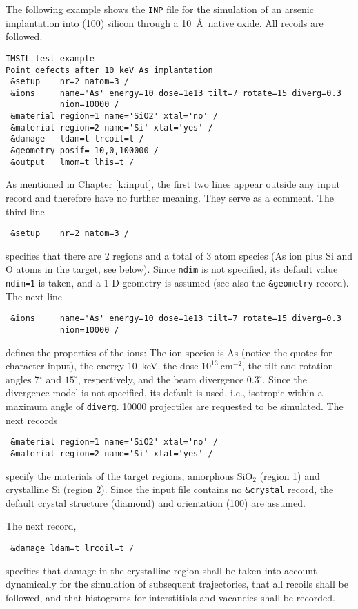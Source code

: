 The following example shows the \texttt{INP} file for the simulation of an 
arsenic implantation into (100) silicon through a 10~\AA\ native oxide. All
recoils are followed.

\begin{verbatim}
IMSIL test example
Point defects after 10 keV As implantation
 &setup    nr=2 natom=3 /
 &ions     name='As' energy=10 dose=1e13 tilt=7 rotate=15 diverg=0.3 
           nion=10000 /
 &material region=1 name='SiO2' xtal='no' /
 &material region=2 name='Si' xtal='yes' /
 &damage   ldam=t lrcoil=t /
 &geometry posif=-10,0,100000 /
 &output   lmom=t lhis=t /
\end{verbatim}

As mentioned in Chapter \ref{k:input}, the first two lines appear outside any
input record and therefore have no further meaning. They serve as a comment. The
third line
%
\begin{verbatim}
 &setup    nr=2 natom=3 /
\end{verbatim}
%
specifies that there are 2 regions and a total of 3 atom species (As ion plus Si
and O atoms in the target, see below). Since \texttt{ndim} is not specified,
its default value \texttt{ndim=1} is taken, and a 1-D geometry is assumed (see
also the \texttt{\&geometry} record). The next line
%
\begin{verbatim}
 &ions     name='As' energy=10 dose=1e13 tilt=7 rotate=15 diverg=0.3 
           nion=10000 /
\end{verbatim}
%
defines the properties of the ions: The ion species is As (notice the quotes for
character input), the energy 10~keV, the dose $10^{13}~$cm$^{-2}$, the tilt and
rotation angles 7$^\circ$ and $15^\circ$, respectively, and the beam divergence
$0.3^\circ$. Since the divergence model is not specified, its default is
used, i.e., isotropic within a maximum angle of \texttt{diverg}. 10000
projectiles are requested to be simulated. The next records
%
\begin{verbatim}
 &material region=1 name='SiO2' xtal='no' /
 &material region=2 name='Si' xtal='yes' /
\end{verbatim}
%
specify the materials of the target regions, amorphous SiO$_2$ (region
1) and crystalline Si (region 2). Since the input file contains no
\texttt{\&crystal} record, the default crystal structure (diamond) and
orientation (100) are assumed.

The next record,
%
\begin{verbatim}
 &damage ldam=t lrcoil=t /
\end{verbatim}
%
specifies that damage in the crystalline region shall be taken into account
dynamically for the simulation of subsequent trajectories, that all recoils
shall be followed, and that histograms for interstitials and vacancies shall
be recorded.

